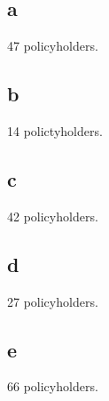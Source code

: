 \documentclass[12pt]{article}
\begin{document}
\subsection{a}
47 policyholders.
\subsection{b}
14 polictyholders.
\subsection{c}
42 policyholders.
\subsection{d}
27 policyholders.
\subsection{e}
66 policyholders.
\end{document}
